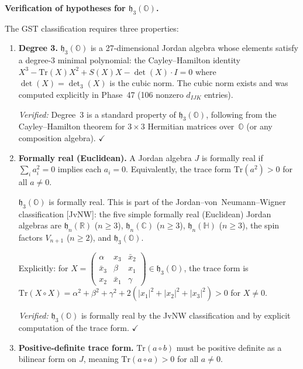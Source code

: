 \medskip

\textbf{Verification of hypotheses for $\mathfrak{h}_3(\mathbb{O})$.}

The GST classification requires three properties:

\begin{enumerate}
  \item[(H1)] \textbf{Degree 3.} $\mathfrak{h}_3(\mathbb{O})$ is a
    27-dimensional Jordan algebra whose elements satisfy a degree-3
    minimal polynomial: the Cayley--Hamilton identity
    $X^3 - \mathrm{Tr}(X) X^2 + S(X) X - \det(X) \cdot I = 0$
    where $\det(X) = \det_3(X)$ is the cubic norm.
    The cubic norm exists and was computed explicitly in Phase~47
    (106 nonzero $d_{IJK}$ entries).

    \textit{Verified:} Degree~3 is a standard property of
    $\mathfrak{h}_3(\mathbb{O})$, following from the Cayley--Hamilton
    theorem for $3\times 3$ Hermitian matrices over~$\mathbb{O}$
    (or any composition algebra). $\checkmark$

  \item[(H2)] \textbf{Formally real (Euclidean).} A Jordan algebra $J$ is
    formally real if $\sum_i a_i^2 = 0$ implies each $a_i = 0$. Equivalently,
    the trace form $\mathrm{Tr}(a^2) > 0$ for all $a \neq 0$.

    $\mathfrak{h}_3(\mathbb{O})$ is formally real. This is part of the
    Jordan--von~Neumann--Wigner classification [JvNW]: the five simple
    formally real (Euclidean) Jordan algebras are $\mathfrak{h}_n(\mathbb{R})$
    ($n \geq 3$), $\mathfrak{h}_n(\mathbb{C})$ ($n \geq 3$),
    $\mathfrak{h}_n(\mathbb{H})$ ($n \geq 3$), the spin factors
    $V_{n+1}$ ($n \geq 2$), and $\mathfrak{h}_3(\mathbb{O})$.

    Explicitly: for $X = \begin{pmatrix} \alpha & x_3 & \bar x_2 \\
    \bar x_3 & \beta & x_1 \\ x_2 & \bar x_1 & \gamma \end{pmatrix}
    \in \mathfrak{h}_3(\mathbb{O})$,
    the trace form is $\mathrm{Tr}(X \circ X) = \alpha^2 + \beta^2 +
    \gamma^2 + 2(|x_1|^2 + |x_2|^2 + |x_3|^2) > 0$ for $X \neq 0$.

    \textit{Verified:} $\mathfrak{h}_3(\mathbb{O})$ is formally real by
    the JvNW classification and by explicit computation of the trace
    form. $\checkmark$

  \item[(H3)] \textbf{Positive-definite trace form.}
    $\mathrm{Tr}(a \circ b)$ must be positive definite as a bilinear
    form on $J$, meaning $\mathrm{Tr}(a \circ a) > 0$ for all $a \neq 0$.


\end{enumerate}
